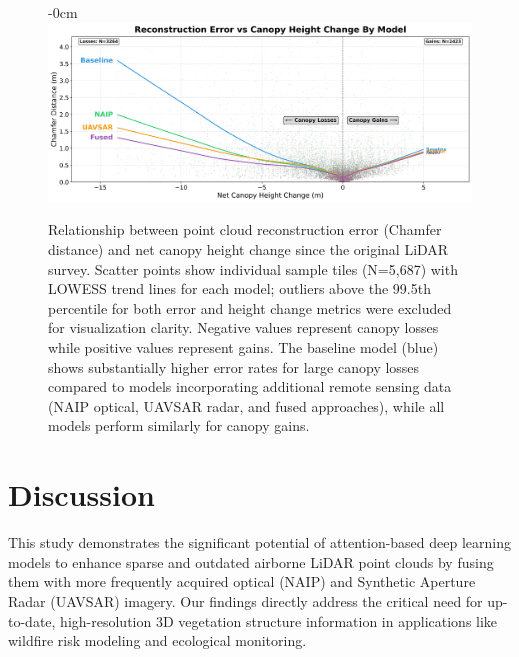 \documentclass[remotesensing,article,submit,pdftex,moreauthors]{Definitions/mdpi}
\newenvironment{widefigure}[1][]{%
  \begin{figure}[#1]\begin{adjustwidth}{-\extralength}{0cm}\centering}{%
  \end{adjustwidth}\end{figure}}
\begin{document}
\begin{widefigure}
    \vspace{-20pt}  
    \centering
    \includegraphics[width=1\linewidth]{manuscript/figures/error_vs_cnpy_chng.png}
    \caption{Relationship between point cloud reconstruction error (Chamfer distance) and net canopy height change since the original LiDAR survey. Scatter points show individual sample tiles (N=5,687) with LOWESS trend lines for each model; outliers above the 99.5th percentile for both error and height change metrics were excluded for visualization clarity. Negative values represent canopy losses while positive values represent gains. The baseline model (blue) shows substantially higher error rates for large canopy losses compared to models incorporating additional remote sensing data (NAIP optical, UAVSAR radar, and fused approaches), while all models perform similarly for canopy gains.}
    \label{fig:error_vs_cnpy_chng}
\end{widefigure}

\section{Discussion}



This study demonstrates the significant potential of attention-based deep learning models to enhance sparse and outdated airborne LiDAR point clouds by fusing them with more frequently acquired optical (NAIP) and Synthetic Aperture Radar (UAVSAR) imagery. Our findings directly address the critical need for up-to-date, high-resolution 3D vegetation structure information in applications like wildfire risk modeling and ecological monitoring.
\end{document}
